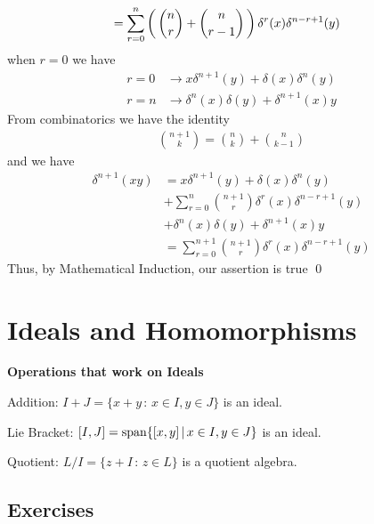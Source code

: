 \documentclass[12pt,a4paper]{report}
\begin{document}
\begin{enumerate}[label=\textit{1.\arabic*}]
{\begin{align*}
	&= \sum_{r=0}^n\left (\, \binom{n}{r}+\binom{n}{r-1} \,\right )\delta^r(x)\delta^{n-r+1}(y) 
\end{align*}
when $r=0$ we have
\begin{align*}
	r=0 & \to x\delta^{n+1}(y) + \delta(x)\delta^{n}(y) \\
	r=n & \to \delta^n(x)\delta(y) + \delta^{n+1}(x)y
\end{align*}From combinatorics we have the identity
\begin{align*}
	\binom{n+1}{k} = \binom{n}{k}+\binom{n}{k-1}
\end{align*}and we have 
\begin{align*}
	\delta^{n+1}(xy) &= x\delta^{n+1}(y) + \delta(x)\delta^{n}(y)\\&+ \sum_{r=0}^n\binom{n+1}{r}\delta^r(x)\delta^{n-r+1}(y) \\&+\delta^n(x)\delta(y) + \delta^{n+1}(x)y \\
	&= \sum_{r=0}^{n+1}\binom{n+1}{r}\delta^r(x)\delta^{n-r+1}(y)
\end{align*}Thus, by Mathematical Induction, our assertion is true \qed
}

\end{enumerate}

\chapter{Ideals and Homomorphisms}

\textbf{Operations that work on Ideals}

\begin{description}
\item Addition: $I+J=\{x+y\,:\, x\in I, y\in J\}$ is an ideal.
\item Lie Bracket: $[I,J]=\operatorname{span}\{[x,y]\,|\,x\in I, y\in J\}$ is an ideal.
\item Quotient: $L/I = \{z+I\,:\, z\in L\}$ is a quotient algebra.
\end{description}

\section{Exercises}
\end{document}
